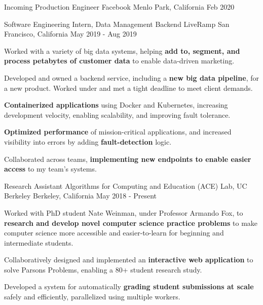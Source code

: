 

\begin{cventries}


\cventry
{Incoming Production Engineer}
{Facebook}
{Menlo Park, California}
{Feb 2020}
{}

\vspace{-5mm}


    \cventry
      {Software Engineering Intern, Data Management Backend}
      {LiveRamp}
      {San Francisco, California}
      {May 2019 - Aug 2019}
      {
        \begin{cvitems}
          \item Worked with a variety of big data systems, helping \textbf{add to, segment, and process petabytes of customer data} to enable data-driven marketing.
          \item Developed and owned a backend service, including a \textbf{new big data pipeline}, for a new product. Worked under and met a tight deadline to meet client demands.
          \item \textbf{Containerized applications} using Docker and Kubernetes, increasing development velocity, enabling scalability, and improving fault tolerance.         
          \item \textbf{Optimized performance} of mission-critical applications, and increased visibility into errors by adding \textbf{fault-detection} logic.
          \item Collaborated across teams, \textbf{implementing new endpoints to enable easier access} to my team's systems.
        \end{cvitems}
      }

    \cventry
      {Research Assistant}
      {Algorithms for Computing and Education (ACE) Lab, UC Berkeley}
      {Berkeley, California}
      {May 2018 - Present}
      {
        \begin{cvitems}
          \item Worked with PhD student Nate Weinman, under Professor Armando Fox, to \textbf{research and develop novel computer science practice problems}
          to make computer science more accessible and easier-to-learn for beginning and intermediate students.
          \item Collaboratively designed and implemented an \textbf{interactive web application} to solve Parsons Problems, enabling a 80+ student research study. 
          \item Developed a system for automatically \textbf{grading student submissions at scale} safely and efficiently, parallelized using multiple workers.
        \end{cvitems}  
      }

\end{cventries}
